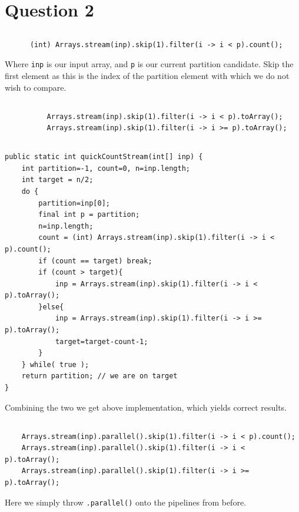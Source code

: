 \documentclass[a5paper]{article}
\begin{document}
\section{Question 2}
\subsection{}
\begin{lstlisting}
      (int) Arrays.stream(inp).skip(1).filter(i -> i < p).count();
\end{lstlisting}
Where \texttt{inp} is our input array, and \texttt{p} is our current partition candidate.
Skip the first element as this is the index of the partition element with which we do not wish to compare.

\subsection{}
\begin{lstlisting}
          Arrays.stream(inp).skip(1).filter(i -> i < p).toArray();
          Arrays.stream(inp).skip(1).filter(i -> i >= p).toArray();
\end{lstlisting}

\subsection{}
\begin{lstlisting}
public static int quickCountStream(int[] inp) {
    int partition=-1, count=0, n=inp.length;
    int target = n/2;
    do {
        partition=inp[0];
        final int p = partition;
        n=inp.length;
        count = (int) Arrays.stream(inp).skip(1).filter(i -> i < p).count();
        if (count == target) break;
        if (count > target){
            inp = Arrays.stream(inp).skip(1).filter(i -> i < p).toArray();
        }else{
            inp = Arrays.stream(inp).skip(1).filter(i -> i >= p).toArray();
            target=target-count-1;
        }
    } while( true );
    return partition; // we are on target
}
\end{lstlisting}

Combining the two we get above implementation, which yields correct results.

\subsection{}
\begin{lstlisting}
    Arrays.stream(inp).parallel().skip(1).filter(i -> i < p).count();
    Arrays.stream(inp).parallel().skip(1).filter(i -> i < p).toArray();
    Arrays.stream(inp).parallel().skip(1).filter(i -> i >= p).toArray();
\end{lstlisting}
Here we simply throw \texttt{.parallel()} onto the pipelines from before.
\end{document}
